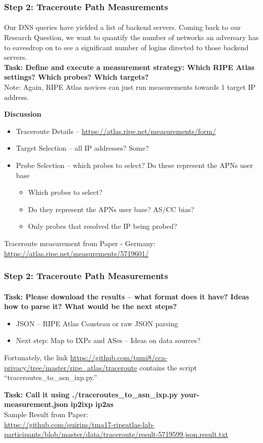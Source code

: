 \begin{frame}
\frametitle{Step 2: Traceroute Path Measurements}
\framesubtitle{}
Our DNS queries have yielded a list of backend servers. Coming back to our Research Question, we want to quantify the number of networks an adversary has to eavesdrop on to see a significant number of logins directed to those backend servers. \\
\textbf{Task: Define and execute a measurement strategy: Which RIPE Atlas settings? Which probes? Which targets?}\\
Note: Again, RIPE Atlas novices can just run measurements towards 1 target IP address.

\pause
\textbf{Discussion}
\begin{itemize}
	\item Traceroute Details -- \url{https://atlas.ripe.net/measurements/form/}
	\item Target Selection -- all IP addresses? Some? 
	\item Probe Selection -- which probes to select? Do these represent the APNs user base
	\begin{itemize}
		\item Which probes to select?
		\item Do they represent the APNs user base? AS/CC bias?
		\item Only probes that resolved the IP being probed?
	\end{itemize}
\end{itemize}

Traceroute measurement from Paper - Germany: \url{https://atlas.ripe.net/measurements/5719601/}
\end{frame}
\clearpage
\begin{frame}
\frametitle{Step 2: Traceroute Path Measurements}
\framesubtitle{}
\textbf{Task: Please download the results -- what format does it have? Ideas how to parse it? What would be the next steps?}
\pause
\begin{itemize}
	\item JSON -- RIPE Atlas Cousteau or raw JSON parsing
	\item Next step: Map to IXPs and ASes -- Ideas on data sources?
\end{itemize}
\pause
Fortunately, the link \url{https://github.com/tumi8/cca-privacy/tree/master/ripe_atlas/traceroute} contains the script ``traceroutes\_to\_asn\_ixp.py.''

\textbf{Task: Call it using ./traceroutes\_to\_asn\_ixp.py your-measurement.json ip2ixp ip2as}\\

Sample Result from Paper:\\ \url{https://github.com/quirins/tma17-ripeatlas-lab-participants/blob/master/data/traceroute/result-5719599.json.result.txt}

\end{frame}
